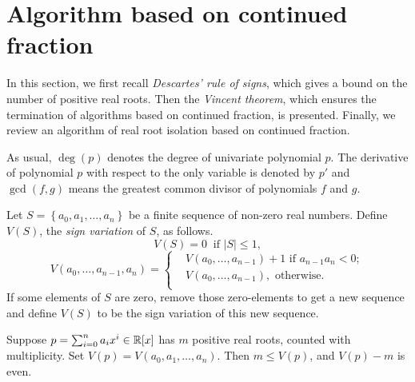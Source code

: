 
\section{Algorithm based on  continued fraction}
\label{sec:contalg}
In this section, we first recall {\em Descartes' rule of signs}, which gives a bound on the number of positive real roots. Then the {\em Vincent theorem}, which  ensures
the termination of algorithms based on  continued fraction, is presented. Finally, we review an algorithm of real root isolation based on  continued fraction.


As usual, $\deg(p)$ denotes the degree of univariate polynomial $p$. The derivative of polynomial $p$ with respect to the only variable is denoted by $p'$ and $\gcd(f,g)$ means the greatest common divisor of polynomials $f$ and $g$.

\begin{note}
Let $S=\left\{ a_0,a_1,\ldots,a_n \right\}$ be a finite sequence of non-zero real numbers. Define $V(S)$, the {\em sign variation} of $S$, as follows.
\[V(S)=0\ \text{ if } |S|\le1,\]
\[  V(a_0,\ldots,a_{n-1},a_n)=  \left\{\begin{aligned}
 &  V(a_0,\ldots,a_{n-1})+1 \text{ if }a_{n-1}a_n<0;\\
&V(a_0,\ldots,a_{n-1}), \text{ otherwise}.\\
	\end{aligned}
	\right.
\]
If some elements of $S$ are zero, remove those zero-elements to get a new sequence and define $V(S)$ to be the sign variation of this new sequence.

\end{note} 





\begin{theorem} \label{thm:des}
  Suppose $p=\sum_{i=0}^na_ix^i\in{\mathbb R}[x]$ has $m$ positive real roots, counted with multiplicity. Set $V(p)=V(a_0,a_1,\ldots,a_n)$. Then $m\le V(p)$, and $V(p)-m$ is even.
\end{theorem}

